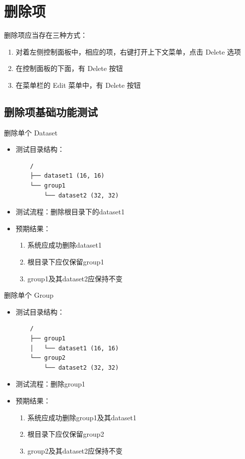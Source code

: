 \documentclass[a4paper,12pt]{report}	%
\begin{document}
\section{删除项}

删除项应当存在三种方式：
\begin{enumerate}
    \item 对着左侧控制面板中，相应的项，右键打开上下文菜单，点击 Delete 选项
    \item 在控制面板的下面，有 Delete 按钮
    \item 在菜单栏的 Edit 菜单中，有 Delete 按钮
\end{enumerate}

\subsection{删除项基础功能测试}
删除单个 Dataset
\begin{itemize}
    \item 测试目录结构：
    \begin{verbatim}
    /
    ├── dataset1 (16, 16)
    └── group1
        └── dataset2 (32, 32)
    \end{verbatim}
    \item 测试流程：删除根目录下的dataset1
    \item 预期结果：
    \begin{enumerate}
        \item 系统应成功删除dataset1
        \item 根目录下应仅保留group1
        \item group1及其dataset2应保持不变
    \end{enumerate}
\end{itemize}

删除单个 Group
\begin{itemize}
    \item 测试目录结构：
    \begin{verbatim}
    /
    ├── group1
    │   └── dataset1 (16, 16)
    └── group2
        └── dataset2 (32, 32)
    \end{verbatim}
    \item 测试流程：删除group1
    \item 预期结果：
    \begin{enumerate}
        \item 系统应成功删除group1及其dataset1
        \item 根目录下应仅保留group2
        \item group2及其dataset2应保持不变
    \end{enumerate}
\end{itemize}
\end{document}
